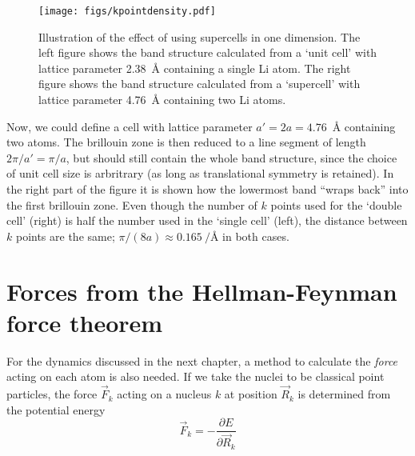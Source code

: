 \documentclass[11pt,bibliography=totoc,index=totoc]{scrbook}   %
\begin{document}
\begin{figure}[htp]
  \centering
  \texttt{[image: figs/kpointdensity.pdf]}
  \caption{Illustration of the effect of using supercells in one dimension. 
  The left figure shows the band structure calculated from a `unit cell' with
  lattice parameter 2.38~Å containing a single Li atom.
  The right figure shows the band structure calculated from a `supercell' with
  lattice parameter 4.76~Å containing two Li atoms.}
  \label{fig:kpointdensities}
\end{figure}

Now, we could define a
cell with lattice parameter $a'=2a=4.76$~Å containing two atoms. 
The brillouin zone is then reduced to a line segment of length $2\pi/a'=\pi/a$,
but should still contain the whole band structure, since the choice of unit cell size is arbritrary (as long as translational symmetry is retained).
In the right part of the figure it is shown how the lowermost band ``wraps back'' into the first brillouin zone.
Even though the number of $k$ points used for the `double cell' (right) is half the number used in the `single cell' (left), 
the distance between $k$ points are the same; $\pi/(8a)\approx \SI{0.165}{\per\angstrom}$ in both cases.


%
\section{Forces from the Hellman-Feynman force theorem}\label{sec:forcetheorem}
%

For the dynamics discussed in the next chapter, a method to calculate the \emph{force} acting on each atom is also needed. 
If we take the nuclei to be classical point particles, 
the force $\vec{F}_k$ acting on a nucleus $k$ at position $\vec{R}_k$ is determined from the potential energy 
\begin{equation}
  \vec{F}_k = -\frac{\partial E}{\partial\vec{R}_k}
\end{equation}
\end{document}

